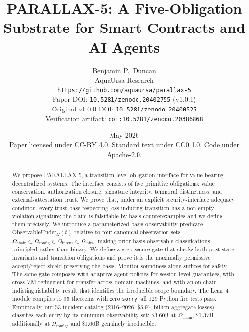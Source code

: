 \documentclass[11pt,a4paper]{article}
\title{\textbf{PARALLAX-5: A Five-Obligation Substrate for Smart Contracts and AI Agents}}
\author{Benjamin P.\ Duncan \\
AquaUrsa Research \\
\texttt{\url{https://github.com/aquaursa/parallax-5}} \\
\small{Paper DOI: \texttt{10.5281/zenodo.20402755} (v1.0.1)} \\
\small{Original v1.0.0 DOI: \texttt{10.5281/zenodo.20400525}} \\
\small{Verification artifact: \texttt{doi:10.5281/zenodo.20386868}}}
\date{May 2026 \\[0.3em]
\small Paper licensed under CC-BY 4.0. Standard text under CC0 1.0. Code under Apache-2.0.}
\begin{document}
\maketitle

\begin{abstract}
We propose PARALLAX-5, a transition-level obligation interface for value-bearing decentralized systems. The interface consists of five primitive obligations: value conservation, authorization closure, signature integrity, temporal distinctness, and external-attestation trust. We prove that, under an explicit security-interface adequacy condition, every trust-base-respecting loss-inducing transition has a non-empty violation signature; the claim is falsifiable by basis counterexamples and we define them precisely. We introduce a parameterized basis-observability predicate $\mathrm{ObservableUnder}_\Omega(t)$ relative to four canonical observation sets $\Omega_{\mathrm{chain}} \subset \Omega_{\mathrm{config}} \subset \Omega_{\mathrm{intent}} \subset \Omega_{\mathrm{infra}}$, making prior basis-observable classifications principled rather than binary. We define a step-secure gate that checks both post-state invariants and transition obligations and prove it is the maximally permissive accept/reject shield preserving the basis. Monitor soundness alone suffices for safety. The same gate composes with adaptive agent policies for session-level guarantees, with cross-VM refinement for transfer across domain machines, and with an on-chain indistinguishability result that identifies the irreducible scope boundary. The Lean~4 module compiles to 95 theorems with zero \texttt{sorry}; all 129 Python fire tests pass. Empirically, our 53-incident catalog (2016--2026, \$5.97~billion aggregate losses) classifies each entry by its minimum observability set: \$3.60B at $\Omega_{\mathrm{chain}}$, \$1.37B additionally at $\Omega_{\mathrm{config}}$, and \$1.00B genuinely irreducible.


\end{abstract}
\end{document}
